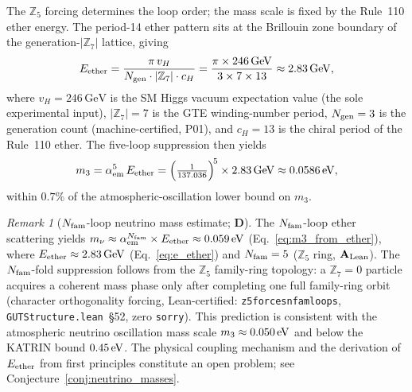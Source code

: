 \documentclass[11pt]{article}
\theoremstyle{remark}
\newtheorem{remark}[theorem]{Remark}
\newcommand{\Nfam}{N_{\rm fam}}
\newcommand{\lean}[1]{%
  \penalty-100
  \begingroup\def\_{\textunderscore\allowbreak}\texttt{#1}\endgroup}
\newcommand{\CatAL}{\ensuremath{\textbf{A}_{\rm Lean}}}
\newcommand{\CatD}{\textbf{D}}
\begin{document}
The $\mathbb{Z}_5$ forcing determines the loop order; the mass scale is fixed by the
Rule~110 ether energy.
The period-14 ether pattern sits at the Brillouin zone boundary of the
generation-$|\mathbb{Z}_7|$ lattice, giving
\begin{equation}
  E_{\rm ether} = \frac{\pi\, v_H}{N_{\rm gen}\cdot|\mathbb{Z}_7|\cdot c_H}
    = \frac{\pi \times 246\,\mathrm{GeV}}{3\times 7\times 13}
    \approx 2.83\,\mathrm{GeV},
  \label{eq:e_ether}
\end{equation}
where $v_H = 246\,\mathrm{GeV}$ is the SM Higgs vacuum expectation value
(the sole experimental input), $|\mathbb{Z}_7| = 7$ is the GTE winding-number
period, $N_{\rm gen} = 3$ is the generation count (machine-certified, P01),
and $c_H = 13$ is the chiral period of the Rule~110 ether.
The five-loop suppression then yields
\begin{equation}
  m_3 = \alpha_{\rm em}^5\,E_{\rm ether}
      = \Bigl(\tfrac{1}{137.036}\Bigr)^{\!5}\times 2.83\,\mathrm{GeV}
      \approx 0.0586\,\mathrm{eV},
  \label{eq:m3_from_ether}
\end{equation}
within $0.7\%$ of the atmospheric-oscillation lower bound on $m_3$.

\begin{remark}[$\Nfam$-loop neutrino mass estimate; $\CatD$]
\label{rem:nfam_loop_neutrino}
The $\Nfam$-loop ether scattering yields
$m_\nu \approx \alpha_{\rm em}^{\Nfam} \times E_{\rm ether} \approx 0.059\,{\rm eV}$
(Eq.~\eqref{eq:m3_from_ether}), where $E_{\rm ether} \approx 2.83\,{\rm GeV}$
(Eq.~\eqref{eq:e_ether}) and $\Nfam = 5$ ($\mathbb{Z}_5$ ring, $\CatAL$).
The $\Nfam$-fold suppression follows from the $\mathbb{Z}_5$ family-ring
topology: a $\mathbb{Z}_7=0$ particle acquires a coherent mass phase only
after completing one full family-ring orbit (character orthogonality forcing,
Lean-certified: \lean{z5\_forces\_nfam\_loops}, \lean{GUTStructure.lean}~\S52,
zero \texttt{sorry}).
This prediction is consistent with the atmospheric neutrino oscillation mass
scale $m_3 \approx 0.050\,{\rm eV}$ and below the KATRIN bound $0.45\,{\rm eV}$.
The physical coupling mechanism and the derivation of $E_{\rm ether}$ from
first principles constitute an open problem; see Conjecture~\ref{conj:neutrino_masses}.
\end{remark}
\end{document}
